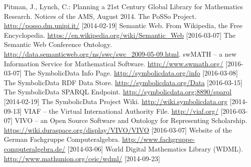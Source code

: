 \documentclass{llncs}
\newcommand{\SD}{{\sc Symbo\-lic\-Data}}
\begin{document}
\begin{thebibliography}{xxx}
 Pitman, J., Lynch, C.: Planning a 21st Century
  Global Library for Mathematics Research.  Notices of the AMS, August
  2014.
 The PoSSo Project. \url{http://posso.dm.unipi.it/}
  [2014-02-19]
 Semantic Web. From Wikipedia, the Free
  Encyclopedia. \url{https://en.wikipedia.org/wiki/Semantic_Web} [2016-03-07]
 The Semantic Web Conference Ontology.
  \url{http://data.semanticweb.org/ns/swc/swc_2009-05-09.html}. 
 swMATH -- a new Information Service for Mathematical Software.
  \url{http://www.swmath.org/} [2016-03-07]
 The {\SD} Info Page.  \url{http://symbolicdata.org/info}
  [2016-03-08]
 The {\SD} RDF Data Store.  \url{http://symbolicdata.org/Data}
  [2016-03-15]
 The {\SD} SPARQL Endpoint.
   \url{http://symbolicdata.org:8890/sparql} [2014-02-19]
 The {\SD} Project Wiki.
   \url{http://wiki.symbolicdata.org} [2014-09-13]
 VIAF -- the Virtual International Authority File.
  \url{http://viaf.org/} [2016-03-07]
 VIVO -- an Open Source Software and Ontology for Representing
  Scholarship.  \url{https://wiki.duraspace.org/display/VIVO/VIVO}
  [2016-03-07]
 Website of the German Fachgruppe Computeralgebra.   
  \url{http://www.fachgruppe-computeralgebra.de/} [2014-03-06]
 World Digital Mathematics Library (WDML).
  \url{http://www.mathunion.org/ceic/wdml/} [2014-09-23]

\end{thebibliography}
\end{document}
